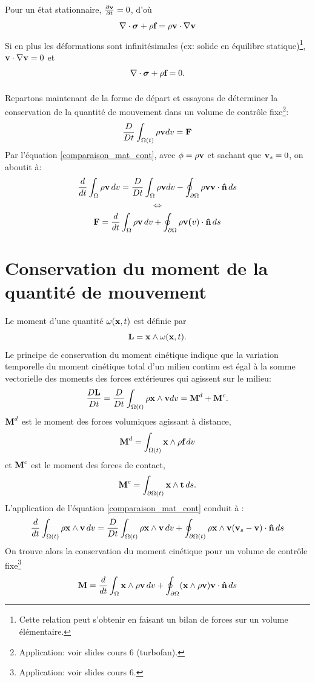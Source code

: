 \paragraph{}
Pour un état stationnaire, $\frac{\partial\textbf{v}}{\partial t}=0$, d'où $$\nabla\cdot\boldsymbol{\sigma}+\rho\textbf{f}=\rho\textbf{v}\cdot\nabla\textbf{v}$$
Si en plus les déformations sont infinitésimales (ex: solide en équilibre statique)\footnote{Cette relation peut s'obtenir en faisant un bilan de forces sur un volume élémentaire.}, $\textbf{v}\cdot\nabla\textbf{v}=0$ et
$$\nabla\cdot\boldsymbol{\sigma}+\rho\textbf{f}=0.$$
\paragraph{}
Repartons maintenant de la forme de départ et essayons de déterminer la conservation de la quantité de mouvement dans un volume de contrôle fixe\footnote{Application: voir slides cours 6 (turbofan).}:
$$\frac{D}{Dt}\int_{\Omega(t)}\rho\textbf{v}dv=\textbf{F}$$
Par l'équation \ref{comparaison_mat_cont}, avec $\phi=\rho\textbf{v}$ et sachant que $\textbf{v}_s=0$, on aboutit à:
$$\frac{d}{dt}\int_{\Omega }\rho\textbf{v}\, dv=\frac{D}{Dt}\int_{\Omega}\rho\textbf{v}dv-\oint_{\partial\Omega }\rho\textbf{v}\textbf{v}\cdot\textbf{\^n}\,ds$$
$$\Leftrightarrow$$
$$\textbf{F}=\frac{d}{dt}\int_{\Omega}\rho\textbf{v}\, dv+\oint_{\partial\Omega }\rho\textbf{v}\textbf{(}v)\cdot\textbf{\^n}\,ds$$

\section{Conservation du moment de la quantité de mouvement}
Le moment d'une quantité $\omega(\textbf{x},t)$ est définie par $$\textbf{L}=\textbf{x}\wedge\omega(\textbf{x},t).$$
Le principe de conservation du moment cinétique indique que la variation temporelle du moment cinétique total  d'un milieu continu est égal à la somme vectorielle des moments des forces extérieures qui agissent sur le milieu:
$$\frac{D\textbf{L}}{Dt}=\frac{D}{Dt}\int_{\Omega (t)}\rho\textbf{x}\wedge\textbf{v}dv=\textbf{M}^d+\textbf{M}^c.$$
$\textbf{M}^d$ est le moment des forces volumiques agissant à distance, $$\textbf{M}^d=\int_{\Omega (t)}\textbf{x}\wedge\rho\textbf{f}\,dv$$ et $\textbf{M}^c$ est le moment des forces de contact,
$$\textbf{M}^c=\int_{\partial\Omega (t)}\textbf{x}\wedge\textbf{t}\,ds.$$
L'application de l'équation \ref{comparaison_mat_cont} conduit à :
$$\frac{d}{dt}\int_{\Omega (t)}\rho\textbf{x}\wedge\textbf{v}\,dv=\frac{D}{Dt}\int_{\Omega (t)}\rho\textbf{x}\wedge\textbf{v}\,dv+\oint_{\partial\Omega (t)}\rho\textbf{x}\wedge\textbf{v}(\textbf{v}_s-\textbf{v})\cdot\textbf{\^n}\,ds$$
On trouve alors la conservation du moment cinétique pour un volume de contrôle fixe\footnote{Application: voir slides cours 6.}
$$\textbf{M}=\frac{d}{dt}\int_{\Omega}\textbf{x}\wedge\rho\textbf{v}\,dv+\oint_{\partial\Omega }(\textbf{x}\wedge\rho\textbf{v})\textbf{v}\cdot\textbf{\^n}\,ds$$
